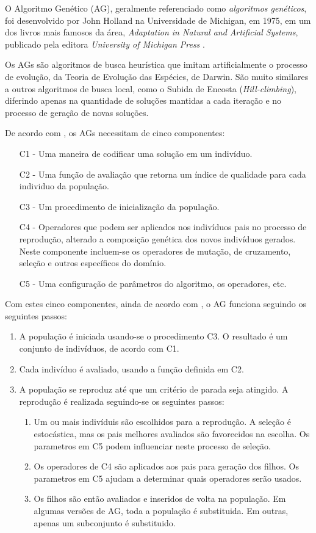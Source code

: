 \documentclass[12pt]{article}
\begin{document}
\par O Algoritmo Genético (AG), geralmente referenciado como \emph{algoritmos genéticos}, foi desenvolvido por John Holland na Universidade de Michigan, em 1975, em um dos livros mais famosos da área, \emph{Adaptation in Natural and Artificial Systems}, publicado pela editora \emph{University of Michigan Press} \cite{essentials}.
\par Os AGs são algoritmos de busca heurística que imitam artificialmente o processo de evolução, da Teoria de Evolução das Espécies, de Darwin. São muito similares a outros algoritmos de busca local, como o Subida de Encosta (\textit{Hill-climbing}), diferindo apenas na quantidade de soluções mantidas a cada iteração e no processo de geração de novas soluções.
\par De acordo com \cite{montana}, os AGs necessitam de cinco componentes:
\begin{enumerate}
\item[C1] - Uma maneira de codificar uma solução em um indivíduo.
\item[C2] - Uma função de avaliação que retorna um índice de qualidade para cada individuo da população.
\item[C3] - Um procedimento de inicialização da população.
\item[C4] - Operadores que podem ser aplicados nos indivíduos pais no processo de reprodução, alterado a composição genética dos novos indivíduos gerados. Neste componente incluem-se os operadores de mutação, de cruzamento, seleção e outros específicos do domínio.
\item[C5] - Uma configuração de parâmetros do algoritmo, os operadores, etc.
\end{enumerate}
Com estes cinco componentes, ainda de acordo com \cite{montana}, o AG funciona seguindo os seguintes passos:
\begin{enumerate}
	\item A população é iniciada usando-se o procedimento C3. O resultado é um conjunto de indivíduos, de acordo com C1.
	\item Cada indivíduo é avaliado, usando a função definida em C2.
	\item A população se reproduz até que um critério de parada seja atingido. A reprodução é realizada seguindo-se os seguintes passos:
	 \begin{enumerate}
		\item Um ou mais indivíduis são escolhidos para a reprodução. A seleção é estocástica, mas os pais melhores avaliados são favorecidos na escolha. Os parametros em C5 podem influenciar neste processo de seleção.
		\item Os operadores de C4 são aplicados aos pais para geração dos filhos. Os parametros em C5 ajudam a determinar quais operadores serão usados.
		\item Os filhos são então avaliados e inseridos de volta na população. Em algumas versões de AG, toda a população é substituida. Em outras, apenas um subconjunto é substituido.		
	\end{enumerate}
\end{enumerate}
\end{document}
